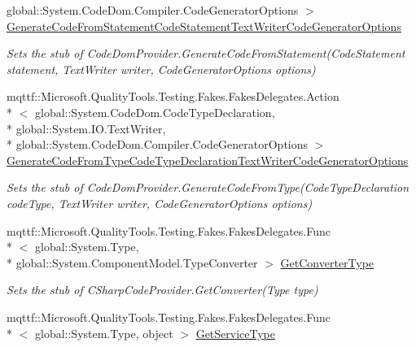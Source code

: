 \begin{DoxyCompactItemize}
global\-::\-System.\-Code\-Dom.\-Compiler.\-Code\-Generator\-Options $>$ \hyperlink{class_microsoft_1_1_c_sharp_1_1_fakes_1_1_stub_c_sharp_code_provider_adcb755b1cac0a6874fb5320a4fa1fb48}{Generate\-Code\-From\-Statement\-Code\-Statement\-Text\-Writer\-Code\-Generator\-Options}
\begin{DoxyCompactList}\small\item\em Sets the stub of Code\-Dom\-Provider.\-Generate\-Code\-From\-Statement(\-Code\-Statement statement, Text\-Writer writer, Code\-Generator\-Options options)\end{DoxyCompactList}\item 
mqttf\-::\-Microsoft.\-Quality\-Tools.\-Testing.\-Fakes.\-Fakes\-Delegates.\-Action\\*
$<$ global\-::\-System.\-Code\-Dom.\-Code\-Type\-Declaration, \\*
global\-::\-System.\-I\-O.\-Text\-Writer, \\*
global\-::\-System.\-Code\-Dom.\-Compiler.\-Code\-Generator\-Options $>$ \hyperlink{class_microsoft_1_1_c_sharp_1_1_fakes_1_1_stub_c_sharp_code_provider_a42194dc51680573f4482cc08cd33b042}{Generate\-Code\-From\-Type\-Code\-Type\-Declaration\-Text\-Writer\-Code\-Generator\-Options}
\begin{DoxyCompactList}\small\item\em Sets the stub of Code\-Dom\-Provider.\-Generate\-Code\-From\-Type(\-Code\-Type\-Declaration code\-Type, Text\-Writer writer, Code\-Generator\-Options options)\end{DoxyCompactList}\item 
mqttf\-::\-Microsoft.\-Quality\-Tools.\-Testing.\-Fakes.\-Fakes\-Delegates.\-Func\\*
$<$ global\-::\-System.\-Type, \\*
global\-::\-System.\-Component\-Model.\-Type\-Converter $>$ \hyperlink{class_microsoft_1_1_c_sharp_1_1_fakes_1_1_stub_c_sharp_code_provider_ad5656e55bd86a2efa0b2a56869ad7a03}{Get\-Converter\-Type}
\begin{DoxyCompactList}\small\item\em Sets the stub of C\-Sharp\-Code\-Provider.\-Get\-Converter(\-Type type)\end{DoxyCompactList}\item 
mqttf\-::\-Microsoft.\-Quality\-Tools.\-Testing.\-Fakes.\-Fakes\-Delegates.\-Func\\*
$<$ global\-::\-System.\-Type, object $>$ \hyperlink{class_microsoft_1_1_c_sharp_1_1_fakes_1_1_stub_c_sharp_code_provider_a9cf970739d51429418052c16cef08afb}{Get\-Service\-Type}

\end{DoxyCompactItemize}
